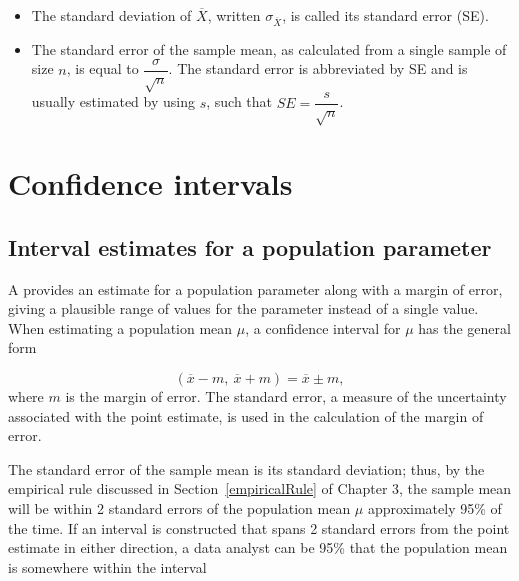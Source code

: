 \begin{spacing}{1.5}
\begin{itemize}
	\item  The standard deviation of $\overline{X}$, written $\sigma_{\overline{X}}$, is called its standard error (SE). 
	
	\item The standard error of the sample mean, as calculated from a single sample of size $n$, is equal to $\dfrac{\sigma}{\sqrt{n}}$. The standard error is abbreviated by SE and is usually estimated by using $s$, such that $SE = \dfrac{s}{\sqrt{n}}$.
	
\end{itemize}


\section[Confidence intervals]{Confidence intervals} %
\label{confidenceIntervals}
\subsection{Interval estimates for a population parameter}

A  provides an estimate for a population parameter along with a margin of error, giving a plausible range of values for the parameter instead of a single value. When estimating a population mean $\mu$, a confidence interval for $\mu$ has the general form

\[(\overline{x} -m, \ \overline{x} + m) = \overline{x} \pm m, \]
where $m$ is the margin of error. The standard error, a measure of the uncertainty associated with the point estimate, is used in the calculation of the margin of error.


The standard error of the sample mean is its standard deviation; thus, by the empirical rule discussed in Section~\ref{empiricalRule} of Chapter 3, the sample mean will be within 2 standard errors of the population mean $\mu$ approximately 95\% of the time. If an interval is constructed that spans 2 standard errors from the point estimate in either direction, a data analyst can be 95\%  that the population mean is somewhere within the interval


\end{spacing}
